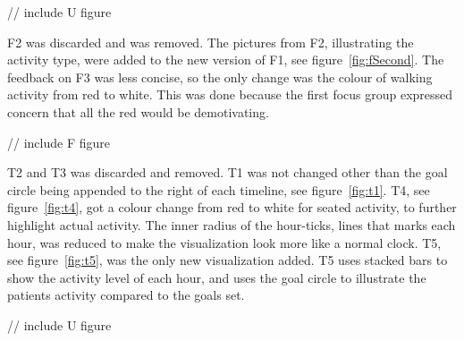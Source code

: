 // include U figure

F2 was discarded and was removed. The pictures from F2, illustrating the activity type, were added to the new version of F1, see figure~\ref{fig:fSecond}. The feedback on F3 was less concise, so the only change was the colour of walking activity from red to white. This was done because the first focus group expressed concern that all the red would be demotivating.

// include F figure

T2 and T3 was discarded and removed. T1 was not changed other than the goal circle being appended to the right of each timeline, see figure~\ref{fig:t1}. T4, see figure~\ref{fig:t4}, got a colour change from red to white for seated activity, to further highlight actual activity. The inner radius of the hour-ticks, lines that marks each hour, was reduced to make the visualization look more like a normal clock. T5, see figure~\ref{fig:t5}, was the only new visualization added. T5 uses stacked bars to show the activity level of each hour, and uses the goal circle to illustrate the patients activity compared to the goals set.

// include U figure
